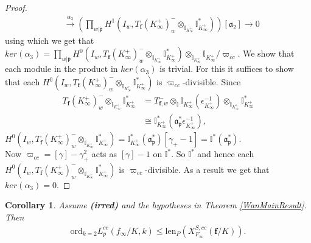 \documentclass[reqno,10pt]{amsart}
\newcommand{\I}{\mathbb{I}}
\newcommand{\f}{\mathbf{f}}
\newcommand{\ma}{\mathfrak{a}}
\newcommand{\p}{\mathfrak{p}}
\newcommand{\kip}{K_\infty^+}
\newcommand{\ikip}{\I_{K_\infty^+}}
\newcommand{\vp}{\varpi}
\theoremstyle{plain}
\newtheorem{cor}[thm]{Corollary}
\theoremstyle{definition}
\begin{document}
\begin{proof}
\begin{align*}
        & \xrightarrow{\alpha_3} \left(\prod_{w|\p} H^1(I_w,T_\f(\kip)^-_w \otimes_{\ikip} \ikip^*) \right)[\ma_2] \rightarrow 0
    \end{align*}
    using which we get that $ker(\alpha_3) = \prod_{w|\p} H^0(I_w,T_\f(\kip)^-_w \otimes_{\ikip} \ikip^*) \otimes_{\ikip} \ikip/\varpi_{cc}$. We show that each module in the product in $ker(\alpha_3)$ is trivial. For this it suffices to show that each $H^0(I_w,T_\f(\kip)^-_w \otimes_{\ikip} \ikip^*)$ is $\vp_{cc}$-divisible.  Since
    \begin{align*}
        T_\f(\kip)^-_w \otimes_{\ikip} \ikip^* & = T_{\f,w}^- \otimes_\I \ikip(\epsilon_{\kip}^{-1}) \otimes_{\ikip} \ikip^* \\
        & \cong \ikip^*(\ma_\p^*\epsilon_{\kip}^{-1}),
    \end{align*}
    $H^0(I_w,T_\f(\kip)^-_w \otimes_{\ikip} \ikip^*) = \ikip^*(\ma_\p^*)[\gamma_+ - 1] = \I^*(\ma_\p^*)$. \\
    Now $\varpi_{cc} = [\gamma] - \gamma^2_+$ acts as $[\gamma] - 1$ on $\I^*$. So $\I^*$ and hence each $H^0(I_w,T_\f(\kip)^-_w \otimes_{\ikip} \ikip^*)$ is $\varpi_{cc}$-divisible. As a result we get that $ker(\alpha_3) = 0$.
\end{proof}

\begin{cor} \label{ineq2}
    Assume \textbf{(irred)} and the hypotheses in Theorem \ref{WanMainResult}. Then
    \begin{align*}
        \mathrm{ord}_{k=2} L_p^{cc}(f_\infty/K,k) \leq \mathrm{len}_{P}(X_{F_\infty}^{S,cc}(\f/K)).
    \end{align*}
\end{cor}
\end{document}
